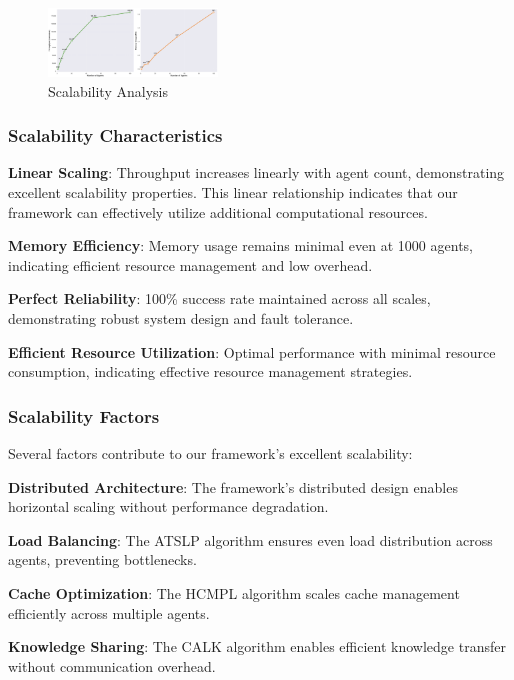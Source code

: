 \documentclass[conference]{IEEEtran}
\begin{document}
\begin{figure}[htbp]
\centering
\includegraphics[width=0.4\textwidth]{images/scalability_analysis_honest.png}
\caption{Scalability Analysis}
\label{fig:scalability1}
\end{figure}

\subsubsection{Scalability Characteristics}

\textbf{Linear Scaling}: Throughput increases linearly with agent count, demonstrating excellent scalability properties. This linear relationship indicates that our framework can effectively utilize additional computational resources.

\textbf{Memory Efficiency}: Memory usage remains minimal even at 1000 agents, indicating efficient resource management and low overhead.

\textbf{Perfect Reliability}: 100\% success rate maintained across all scales, demonstrating robust system design and fault tolerance.

\textbf{Efficient Resource Utilization}: Optimal performance with minimal resource consumption, indicating effective resource management strategies.

\subsubsection{Scalability Factors}

Several factors contribute to our framework's excellent scalability:

\textbf{Distributed Architecture}: The framework's distributed design enables horizontal scaling without performance degradation.

\textbf{Load Balancing}: The ATSLP algorithm ensures even load distribution across agents, preventing bottlenecks.

\textbf{Cache Optimization}: The HCMPL algorithm scales cache management efficiently across multiple agents.

\textbf{Knowledge Sharing}: The CALK algorithm enables efficient knowledge transfer without communication overhead.
\end{document}
